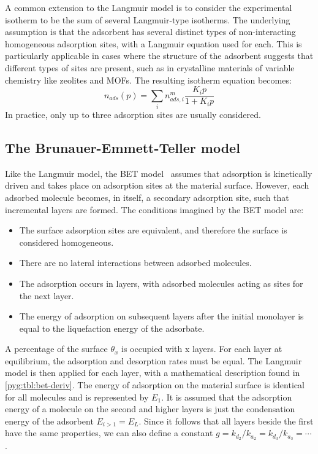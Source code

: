 A common extension to the Langmuir model is to consider
the experimental isotherm to be the sum of several Langmuir-type
isotherms. The underlying assumption is that the adsorbent has 
several distinct types of non-interacting homogeneous adsorption 
sites, with a Langmuir equation used for each. This is particularly
applicable in cases where the structure of the adsorbent
suggests that different types of sites are present,
such as in crystalline materials of variable chemistry like
zeolites and \glspl{MOF}. The resulting isotherm equation becomes:
%
\begin{equation}\label{pyg:eqn:langmulti}
	n_{ads}(p) = \sum_i n_{ads,i}^m\frac{K_i p}{1+K_i p}
\end{equation}
%
In practice, only up to three adsorption sites are usually
considered.

\subsection{The Brunauer-Emmett-Teller model}\label{pyg:models:bet}

Like the Langmuir model, the \gls{BET} model~\cite{brunauerAdsorptionGasesMultimolecular1938}
assumes that adsorption is kinetically driven and takes place on adsorption
sites at the material surface. However, each adsorbed molecule becomes,
in itself, a secondary adsorption site, such that incremental layers
are formed. The conditions imagined by the \gls{BET} model are:

\begin{itemize}
	\item The surface adsorption sites are equivalent, and therefore the
	      surface is considered homogeneous.
	\item There are no lateral interactions between adsorbed
	      molecules.
	\item The adsorption occurs in layers, with adsorbed
	      molecules acting as sites for the next layer.
	\item The energy of adsorption on subsequent layers after 
		  the initial monolayer is equal to the liquefaction energy
		  of the adsorbate.
\end{itemize}

A percentage of the surface \(\theta_x\) is occupied with
x layers. For each layer at equilibrium, the adsorption 
and desorption rates must be equal.
The Langmuir model is then applied for each layer, with a 
mathematical description found in \autoref{pyg:tbl:bet-deriv}.
The energy of adsorption on the material surface is identical 
for all molecules and is represented by \(E_1\).
It is assumed that the adsorption energy of a molecule on the second
and higher layers is just the condensation energy of the
adsorbent \(E_{i>1} = E_L\). Since it follows that
all layers beside the first have the same properties,
we can also define a constant 
\(g= {k_{d_2}}/{k_{a_2}} = {k_{d_3}}/{k_{a_3}} = \cdots \).

